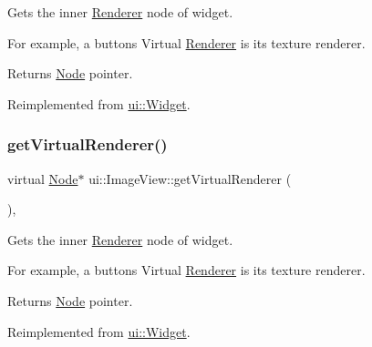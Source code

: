 Gets the inner \hyperlink{classRenderer}{Renderer} node of widget.

For example, a button\textquotesingle{}s Virtual \hyperlink{classRenderer}{Renderer} is it\textquotesingle{}s texture renderer.

\begin{DoxyReturn}{Returns}
\hyperlink{classNode}{Node} pointer. 
\end{DoxyReturn}


Reimplemented from \hyperlink{classui_1_1Widget_acf862bf9235fbb3823819eeb65d46f25}{ui\+::\+Widget}.

\mbox{\label{classui_1_1ImageView_af98c832737c94dd9113967df15854318}} 
\subsubsection{\texorpdfstring{get\+Virtual\+Renderer()}{getVirtualRenderer()}\hspace{0.1cm}{\footnotesize\ttfamily [2/2]}}
{\footnotesize\ttfamily virtual \hyperlink{classNode}{Node}$\ast$ ui\+::\+Image\+View\+::get\+Virtual\+Renderer (\begin{DoxyParamCaption}{ }\end{DoxyParamCaption})\hspace{0.3cm}{\ttfamily [override]}, {\ttfamily [virtual]}}

Gets the inner \hyperlink{classRenderer}{Renderer} node of widget.

For example, a button\textquotesingle{}s Virtual \hyperlink{classRenderer}{Renderer} is it\textquotesingle{}s texture renderer.

\begin{DoxyReturn}{Returns}
\hyperlink{classNode}{Node} pointer. 
\end{DoxyReturn}


Reimplemented from \hyperlink{classui_1_1Widget_acf862bf9235fbb3823819eeb65d46f25}{ui\+::\+Widget}.

\mbox{\label{classui_1_1ImageView_ae146b477fee678c08dfd0875aa0828df}} 
